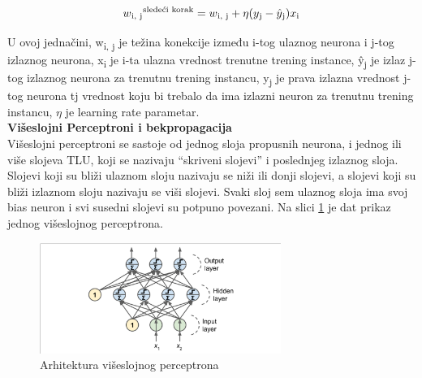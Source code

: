 \documentclass[a4paper,12pt]{report}
\begin{document}
\begin{equation}\label{eq:perceptronlearningrule}
w\textsubscript{i, j}\textsuperscript{sledeći korak} = w\textsubscript{i, j} + \eta (y\textsubscript{j} - \hat{y}\textsubscript{j})x\textsubscript{i}
\end{equation}

U ovoj jednačini, w\textsubscript{i, j} je težina konekcije između i-tog ulaznog neurona i j-tog izlaznog neurona, x\textsubscript{i} je i-ta ulazna vrednost trenutne trening instance, \^y\textsubscript{j} je izlaz j-tog izlaznog neurona za trenutnu trening instancu, y\textsubscript{j} je prava izlazna vrednost j-tog neurona tj vrednost koju bi trebalo da ima izlazni neuron za trenutnu trening instancu, $\eta$ je learning rate parametar.\\

\textbf{Višeslojni Perceptroni i bekpropagacija}\\

Višeslojni perceptroni se sastoje od jednog sloja propusnih neurona, i jednog ili više slojeva TLU, koji se nazivaju \enquote{skriveni slojevi} i poslednjeg izlaznog sloja. Slojevi koji su bliži ulaznom sloju nazivaju se niži ili donji slojevi, a slojevi koji su bliži izlaznom sloju nazivaju se viši slojevi. Svaki sloj sem ulaznog sloja ima svoj bias neuron i svi susedni slojevi su potpuno povezani. Na slici \ref{fig:mlp} je dat prikaz jednog višeslojnog perceptrona. 

\begin{figure}[h]
    \centering
    \includegraphics[width=0.7\textwidth]{MLP_architecture.png}
    \caption{Arhitektura višeslojnog perceptrona}\label{fig:mlp}
\end{figure}
\end{document}
